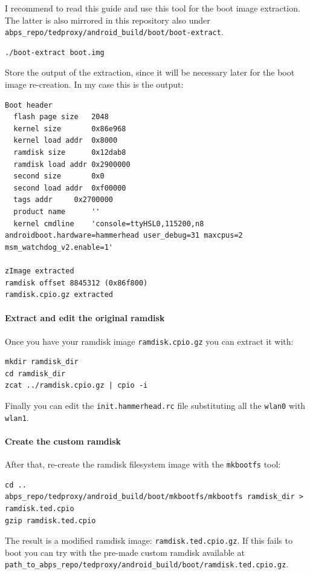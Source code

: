 \documentclass[a4paper]{article}
\begin{document}
I recommend to read this guide\cite{androidboot} and use 
this tool\cite{bootextract} for the boot image extraction. 
The latter is also mirrored in this repository also under
\texttt{abps\_repo/tedproxy/android\_build/boot/boot-extract}.
\begin{lstlisting}
./boot-extract boot.img
\end{lstlisting}

Store the output of the extraction, since it will be necessary later for the boot image re-creation.
In my case this is the output:

\begin{lstlisting}
Boot header
  flash page size	2048
  kernel size		0x86e968
  kernel load addr	0x8000
  ramdisk size		0x12dab8
  ramdisk load addr	0x2900000
  second size		0x0
  second load addr	0xf00000
  tags addr	 	0x2700000
  product name		''
  kernel cmdline	'console=ttyHSL0,115200,n8 androidboot.hardware=hammerhead user_debug=31 maxcpus=2 msm_watchdog_v2.enable=1'

zImage extracted
ramdisk offset 8845312 (0x86f800)
ramdisk.cpio.gz extracted
\end{lstlisting}
\paragraph{Extract and edit the original ramdisk}
Once you have your ramdisk image \texttt{ramdisk.cpio.gz} you can extract it with:

\begin{lstlisting}
mkdir ramdisk_dir
cd ramdisk_dir
zcat ../ramdisk.cpio.gz | cpio -i
\end{lstlisting}

Finally you can edit the \texttt{init.hammerhead.rc} file substituting all the \texttt{wlan0} with \texttt{wlan1}.

\paragraph{Create the custom ramdisk}
After that, re-create the ramdisk filesystem image with the \texttt{mkbootfs} tool:

\begin{lstlisting}
cd ..
abps_repo/tedproxy/android_build/boot/mkbootfs/mkbootfs ramdisk_dir > ramdisk.ted.cpio
gzip ramdisk.ted.cpio
\end{lstlisting}

The result is a modified ramdisk image: \texttt{ramdisk.ted.cpio.gz}. If this fails to boot you can try with the
 pre-made custom ramdisk available at
 \texttt{path\_to\_abps\_repo/tedproxy/android\_build/boot/ramdisk.ted.cpio.gz}.
\end{document}
